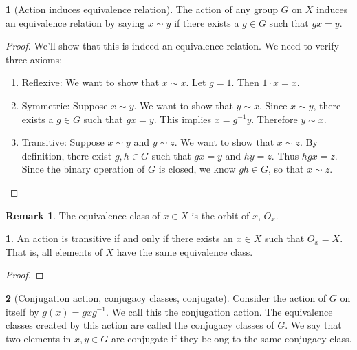 \documentclass[12pt]{article}
\theoremstyle{definition}
\newtheorem{definition}{\color{NavyBlue}{\textbf{Definition}}}
\newtheorem{theorem}{\color{ForestGreen}{\textbf{Theorem}}}
\newtheorem{remark}{Remark}
\theoremstyle{definition}
\begin{document}
\begin{definition}[Action induces equivalence relation]
	The action of any group $G$ on $X$ induces an equivalence relation by saying $x \sim y$ if there exists a $g \in G$ such that $gx = y$. 
\end{definition}
\begin{proof}
We'll show that this is indeed an equivalence relation. We need to verify three axioms:
\begin{enumerate}
	\item Reflexive: We want to show that $x\sim x$. Let $g = 1$. Then $1 \cdot x = x$.
	\item Symmetric: Suppose $x \sim y$. We want to show that $y \sim x$. Since $x \sim y$, there exists a $g \in G$ such that $gx = y$. This implies $x = g^{-1}y$. Therefore $y \sim x$. 
	\item Transitive: Suppose $x\sim y$ and $y \sim z$. We want to show that $x \sim z$. By definition, there exist $g,h \in G$ such that $gx = y$ and $hy = z$. Thus $hgx = z$. Since the binary operation of $G$ is closed, we know $gh \in G$, so that $x \sim z$. 
\end{enumerate}
\end{proof}

\begin{remark}
The equivalence class of $x \in X$ is the orbit of $x$, $O_x$. 
\end{remark}

\begin{theorem}
An action is transitive if and only if there exists an $x \in X$ such that $O_x = X$. That is, all elements of $X$ have the same equivalence class. 
\end{theorem}
\begin{proof}
	\color{Red}{TODO}
\end{proof}

\begin{definition}[Conjugation action, conjugacy classes, conjugate]
	Consider the action of $G$ on itself by $g(x) = gxg^{-1}$. We call this the conjugation action. The equivalence classes created by this action are called the conjugacy classes of $G$. We say that two elements in $x,y\in G$ are conjugate if they belong to the same conjugacy class. 
\end{definition}
\end{document}
